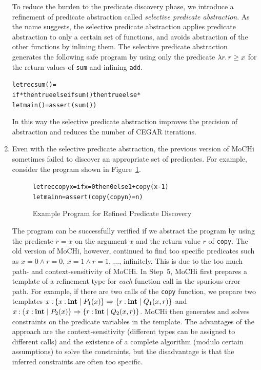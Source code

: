 \begin{enumerate}
      To reduce the burden to the predicate discovery phase, we introduce
      a refinement of predicate abstraction called \emph{selective
      predicate abstraction}.  As the name suggests, the selective
      predicate abstraction applies predicate abstraction to only a
      certain set of functions, and avoids abstraction of the other
      functions by inlining them.  The selective predicate abstraction
      generates the following safe program by using only the
      predicate $\lambda{r}.\,{r \geq x}$ for the return values of \texttt{sum}
      and inlining \texttt{add}.
\vspace{-5pt}
\begin{alltt}
 letrec sum () =
   if * then true else if sum() then true else *
 let main () = assert (sum ())
\end{alltt}
\vspace{-5pt}
      In this way the selective predicate abstraction improves the
      precision of abstraction and reduces the number of CEGAR iterations.

\item Even with the selective predicate abstraction, the previous
      version of MoCHi sometimes failed to discover an appropriate
      set of predicates. For example, consider the program
      shown in Figure~\ref{fig:copy}.
\begin{figure}[t]
\vspace{-5pt}
\begin{alltt}
 letrec copy x = if x=0 then 0 else 1 + copy (x-1)
 let main n = assert (copy (copy n) = n)
\end{alltt}
\vspace{-5pt}
\caption{Example Program for Refined Predicate Discovery}
\label{fig:copy}
\end{figure}
      The program can be successfully verified if we abstract the
      program by using the predicate \(r=x\) on the argument \(x\) and
      the return value \(r\) of \texttt{copy}.  The old version of
      MoCHi, however, continued to find too specific predicates such as
      \(x=0\land r=0\), \(x=1\land r=1\), ..., infinitely.  This is due
      to the too much path- and context-sensitivity of MoCHi.  In
      Step~5, MoCHi first prepares a template of a refinement type for
      \emph{each} function call in the spurious error path.  For
      example, if there are two calls of the \texttt{copy} function, we
      prepare two templates \(x\mathbin{:}\{{x\mathbin{:}\mathbf{int} \mid P_1(x)}\}\Rightarrow
      \{{r\mathbin{:}\mathbf{int} \mid Q_1(x,r)}\}\) and \(x\mathbin{:}\{{x\mathbin{:}\mathbf{int} \mid
      P_2(x)}\}\Rightarrow \{{r\mathbin{:}\mathbf{int} \mid Q_2(x,r)}\}\).  MoCHi then generates
      and solves constraints on the predicate variables in the template.
      The advantages of the approach are the context-sensitivity
      (different types can be assigned to different calls) and the
      existence of a complete algorithm (modulo certain assumptions) to
      solve the constraints, but the disadvantage is that the inferred
      constraints are often too specific.


\end{enumerate}

